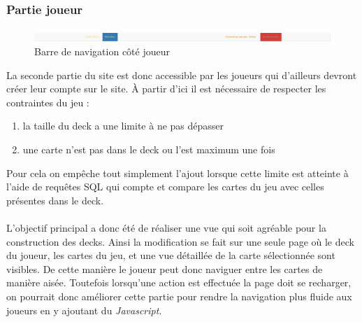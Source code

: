 \documentclass[a4paper,11pt]{report}
\begin{document}
	\newpage

	\subsubsection{Partie joueur}
	\paragraph{}

	\begin{figure}[th]
      	 \begin{center}
          \includegraphics[scale=0.25]{Assets/navbar_joueur.png}
          \caption{Barre de navigation côté joueur}
          \label{RepTravail}
         \end{center}
        \end{figure}

      La seconde partie du site est donc accessible par les joueurs qui d'ailleurs devront créer leur compte sur le site. À partir d'ici il est nécessaire de respecter les contraintes du jeu : 

	\begin{enumerate}
		\item la taille du deck a une limite à ne pas dépasser
		\item une carte n'est pas dans le deck ou l'est maximum une fois
	\end{enumerate}Pour cela on empêche tout simplement l'ajout lorsque cette limite est atteinte à l'aide de requêtes SQL qui compte et compare les cartes du jeu avec celles présentes dans le deck.
	
	\paragraph{}
	L'objectif principal a donc été de réaliser une vue qui soit agréable pour la construction des decks. Ainsi la modification se fait sur une seule page où le deck du joueur, les cartes du jeu, et une vue détaillée de la carte sélectionnée sont visibles. De cette manière le joueur peut donc naviguer entre les cartes de manière aisée. Toutefois lorsqu'une action est effectuée la page doit se recharger, on pourrait donc améliorer cette partie pour rendre la navigation plus fluide aux joueurs en y ajoutant du \textit{Javascript}.
\end{document}
